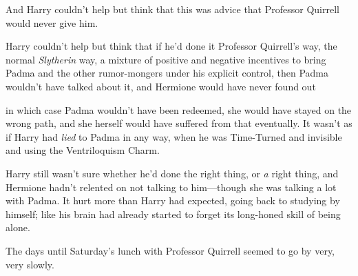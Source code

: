 And Harry couldn't help but think that this was advice that Professor Quirrell
would never give him.

Harry couldn't help but think that if he'd done it Professor Quirrell's way,
the normal \emph{Slytherin} way, a mixture of positive and negative incentives
to bring Padma and the other rumor-mongers under his explicit control, then
Padma wouldn't have talked about it, and Hermione would have never found
out{\el}

{\el} in which case Padma wouldn't have been redeemed, she would have stayed
on the wrong path, and she herself would have suffered from that eventually. It
wasn't as if Harry had \emph{lied} to Padma in any way, when he was Time-Turned
and invisible and using the Ventriloquism Charm.

Harry still wasn't sure whether he'd done the right thing, or \emph{a} right
thing, and Hermione hadn't relented on not talking to him—though she was
talking a lot with Padma. It hurt more than Harry had expected, going back to
studying by himself; like his brain had already started to forget its
long-honed skill of being alone.

The days until Saturday's lunch with Professor Quirrell seemed to go by very,
very slowly.
